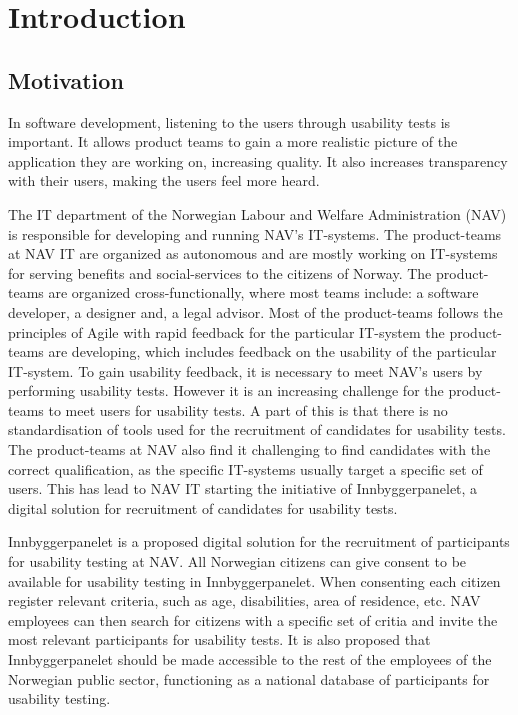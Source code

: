 \section{Introduction}

\subsection{Motivation}
In software development, listening to the users through usability tests is important. It allows product teams to gain a more realistic picture of the application they are working on, increasing quality. It also increases transparency with their users, making the users feel more heard. 

The IT department of the Norwegian Labour and Welfare Administration (NAV) is responsible for developing and running NAV's IT-systems. The product-teams at NAV IT are organized as autonomous and are mostly working on IT-systems for serving benefits and social-services to the citizens of Norway. The product-teams are organized cross-functionally, where most teams include: a software developer, a designer and, a legal advisor. Most of the product-teams follows the principles of Agile with rapid feedback for the particular IT-system the product-teams are developing, which includes feedback on the usability of the particular IT-system. To gain usability feedback, it is necessary to meet NAV's users by performing usability tests. However it is an increasing challenge for the product-teams to meet users for usability tests. A part of this is that there is no standardisation of tools used for the recruitment of candidates for usability tests. The product-teams at NAV also find it challenging to find candidates with the correct qualification, as the specific IT-systems usually target a specific set of users. This has lead to NAV IT starting the initiative of Innbyggerpanelet, a digital solution for recruitment of candidates for usability tests.

Innbyggerpanelet is a proposed digital solution for the recruitment of participants for usability testing at NAV. All Norwegian citizens can give consent to be available for usability testing in Innbyggerpanelet. When consenting each citizen register relevant criteria, such as age, disabilities, area of residence, etc. NAV employees can then search for citizens with a specific set of critia and invite the most relevant participants for usability tests. It is also proposed that Innbyggerpanelet should be made accessible to the rest of the employees of the Norwegian public sector, functioning as a national database of participants for usability testing.


